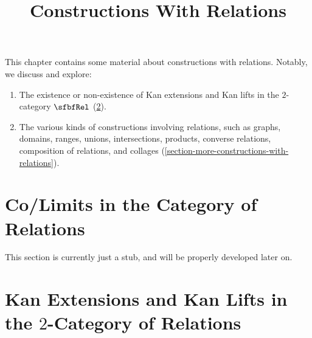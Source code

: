 

%



\title{Constructions With Relations}

\maketitle

\label{section-phantom}

This chapter contains some material about constructions with relations. Notably, we discuss and explore:
\begin{enumerate}
    \item\label{constructions-with-relations-introduction-item-1}The existence or non-existence of Kan extensions and Kan lifts in the $2$-category $\sfbfRel$ (\cref{section-kan-extensions-and-kan-lifts-in-the-2-category-of-relations}).
    \item\label{constructions-with-relations-introduction-item-2}The various kinds of constructions involving relations, such as graphs, domains, ranges, unions, intersections, products, converse relations, composition of relations, and collages (\cref{section-more-constructions-with-relations}).
\end{enumerate}

\ChapterTableOfContents

\section{Co/Limits in the Category of Relations}\label{section-co-limits-in-the-category-of-relations}
This section is currently just a stub, and will be properly developed later on.
\section{Kan Extensions and Kan Lifts in the $2$-Category of Relations}\label{section-kan-extensions-and-kan-lifts-in-the-2-category-of-relations}
